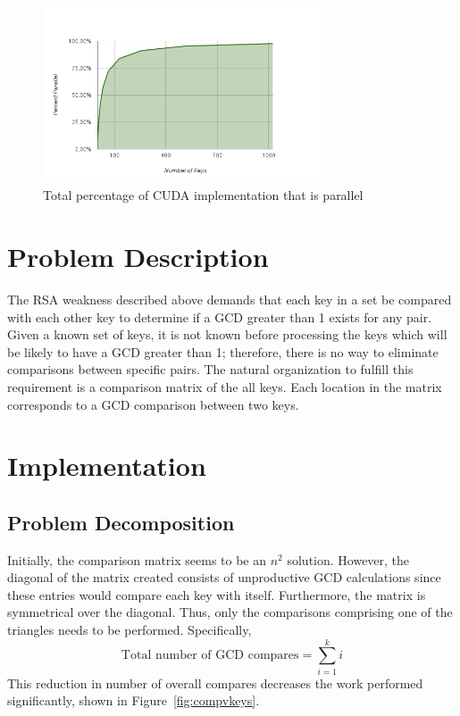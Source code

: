 \documentclass[smallextended]{svjour3}       %
\begin{document}
\begin{figure}
   \centering
   \includegraphics[width=0.75\textwidth]{chart_7}
   \caption{Total percentage of CUDA implementation that is parallel}
   \label{fig:parPercent}
\end{figure}


\section{Problem Description}
\label{sec:probdesc}
The RSA weakness described above demands that each key in a set be 
compared with each other key to determine if a GCD greater than 1 exists for 
any pair. Given a known set of keys, it is not known before processing 
the keys which will be likely to have a GCD greater than 1; therefore, there 
is no way to eliminate comparisons between specific pairs. The natural 
organization to fulfill this requirement is a comparison matrix of the all 
keys. Each location in the matrix corresponds to a GCD comparison between two 
keys.


\section{Implementation}
\label{sec:impl}

\subsection{Problem Decomposition}
\label{subsec:probdecomp}

Initially, the comparison matrix seems to be an $n^2$ solution. However, the 
diagonal of the matrix created consists of unproductive GCD calculations since 
these entries would compare each key with itself. Furthermore, the matrix is 
symmetrical over the diagonal. Thus, only the comparisons comprising one of 
the triangles needs to be performed. Specifically, 
\begin{equation}
   \mbox{Total number of GCD compares} = \sum_{i=1}^k i
   \label{eq:gcd}
\end{equation}
This reduction in number of overall compares decreases the work 
performed significantly, shown in Figure~\ref{fig:compvkeys}. 
\end{document}
